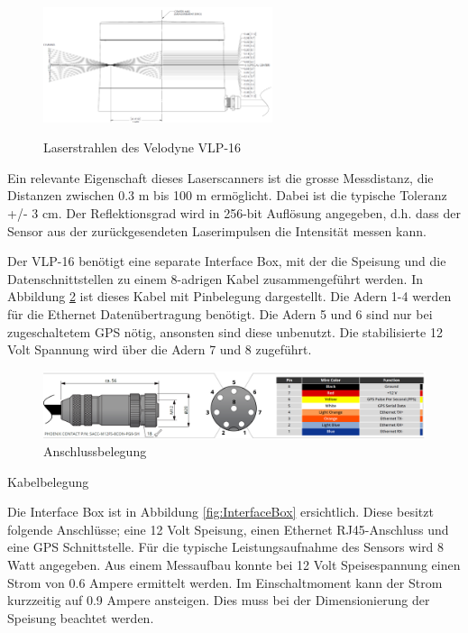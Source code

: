 \begin{figure}[H]
	\centering
	\includegraphics[width=0.6\textwidth]
	{resources/velodyne_channels.PNG}
	\caption[Laserstrahlen des Velodyne  VLP-16]{Laserstrahlen des Velodyne  VLP-16} \protect\cite{velodyne}
	\label{fig:angleVLP}
\end{figure}

Ein relevante Eigenschaft dieses Laserscanners ist die grosse Messdistanz, die Distanzen zwischen 0.3 m bis 100 m ermöglicht. Dabei ist die typische Toleranz +/- 3 cm. Der Reflektionsgrad wird in 256-bit Auflösung angegeben, d.h. dass der Sensor aus der zurückgesendeten Laserimpulsen die Intensität messen kann.

Der VLP-16 benötigt eine separate Interface Box, mit der die Speisung und die Datenschnittstellen zu einem 8-adrigen Kabel zusammengeführt werden. In Abbildung \ref{fig:CablePin} ist dieses Kabel mit Pinbelegung dargestellt. Die Adern 1-4 werden für die Ethernet Datenübertragung benötigt. Die Adern 5 und 6 sind nur bei zugeschaltetem \ac{GPS} nötig, ansonsten sind diese unbenutzt. Die stabilisierte 12 Volt Spannung wird über die Adern 7 und 8 zugeführt.
	\begin{table}
		\centering
		
\begin{figure}[H]
	\centering
	\includegraphics[width=1\textwidth]{resources/Cablepins.PNG}
	\caption[Anschluss und Kabelbelegung]{Anschlussbelegung}
	\label{fig:CablePin}
\end{figure} 
	\caption[Anschluss und Kabelbelegung]{Kabelbelegung}
	\protect\cite{velodyne}	
\end{table} 
Die Interface Box ist in Abbildung \ref{fig:InterfaceBox} ersichtlich. Diese besitzt folgende Anschlüsse; eine 12 Volt Speisung, einen Ethernet RJ45-Anschluss und eine \ac{GPS} Schnittstelle. Für die typische Leistungsaufnahme des Sensors wird 8 Watt angegeben. Aus einem Messaufbau konnte bei 12 Volt Speisespannung einen Strom von 0.6 Ampere ermittelt werden. Im Einschaltmoment kann der Strom kurzzeitig auf 0.9 Ampere ansteigen. Dies muss bei der Dimensionierung der Speisung beachtet werden.  

